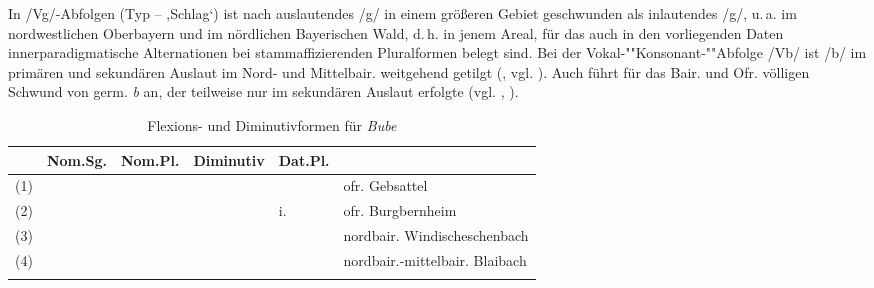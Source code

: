 In /Vg/-Abfolgen (Typ  --  ‚Schlag‘) ist nach \citet[§28c1]{Kranzmayer1956} auslautendes /g/ in einem größeren Gebiet geschwunden als inlautendes /g/, u.\,a. im nordwestlichen Oberbayern und im nördlichen Bayerischen Wald, d.\,h. in jenem Areal, für das auch in den vorliegenden Daten innerparadigmatische Alternationen bei stammaffizierenden Pluralformen belegt sind. Bei der Vo\-kal-""Kon\-so\-nant-""Ab\-fol\-ge /Vb/ ist /b/ im primären und sekundären Auslaut im Nord- und Mittelbair. weitgehend getilgt (\citealt[§30b3]{Kranzmayer1956}, vgl. \citealt[305]{Schirmunski1962}). Auch \citet[35--36]{Lessiak1933} führt für das Bair. und Ofr. völligen Schwund von germ. \textit{b} an, der teilweise nur im sekundären Auslaut erfolgte (vgl. \citealt[Karte 9]{Roth1940}, \citealt[219]{Steger1968}).


\begin{table}
\small
\begin{tabularx}{\textwidth}{lllllQ}
\lsptoprule
& {Nom.Sg.} & {Nom.Pl.} & {Diminutiv} & {Dat.Pl.} & \\
\midrule
(1) &  &  &  &   & ofr. Gebsattel\\
(2) &  &  &  &  i.  & ofr. Burgbernheim \\
(3) &  &  &  &   & nordbair. Windischeschenbach\\
(4) &  &  &  &   & nordbair.-mittelbair. Blaibach\\
\lspbottomrule
\end{tabularx}
\caption{Flexions- und Diminutivformen für \textit{Bube}}
\label{tab:35}
\end{table}

